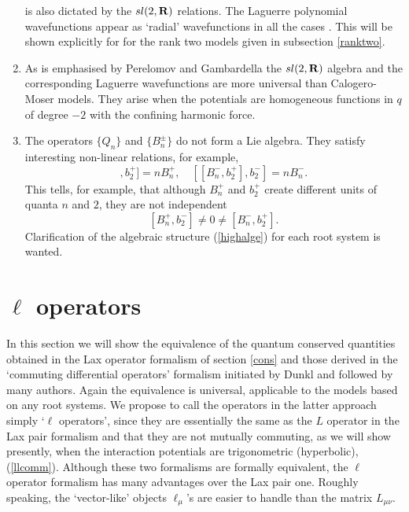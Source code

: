 \documentclass[a4paper,12pt]{article}
\begin{document}
\begin{enumerate}
is also dictated by the \(sl(2,{\bf R})\) relations.
The Laguerre polynomial wavefunctions appear as `radial' wavefunctions
in all the cases \cite{Cal1}.
This will be shown explicitly for
for the rank two models given in subsection \ref{ranktwo}.
\item
As is emphasised by Perelomov \cite{Pere1} and Gambardella \cite{Gamb}
the \(sl(2,{\bf R})\) algebra and the corresponding
Laguerre wavefunctions
are more universal than Calogero-Moser models.
They arise when the potentials are homogeneous functions
in \(q\) of degree
\(-2\) with the confining harmonic force.
\item
The operators \(\{Q_n\}\) and \(\{B_n^\pm\}\) do not form a Lie algebra.
They satisfy interesting non-linear relations, for example,
\begin{equation}
   [[B_n^+,b_2^-],b_2^+]=nB_n^+,\quad
   [[B_n^-,b_2^+],b_2^-]=nB_n^-.
   \label{highalge}
\end{equation}
This tells, for example, that although \(B_n^+\) and \(b_2^+\)
create different units of quanta \(n\) and \(2\), they are not independent
\[
   [B_n^+,b_2^-]\neq0\neq [B_n^-,b_2^+].
\]
Clarification of the algebraic structure (\ref{highalge}) for each root
system is wanted.
\end{enumerate}



\section{\(\ell\) operators}
\label{lops}
\setcounter{equation}{0}
In this section we will show the equivalence of the
quantum conserved quantities obtained in the Lax operator formalism
of section \ref{cons} and those derived in the `commuting differential
operators' formalism initiated by Dunkl \cite{Dunk} and followed by many
authors.
Again the equivalence is universal, applicable to the models based on
any root systems.
We propose to call the operators in the latter approach simply
`\(\ell\) operators', since they are essentially the same as the
\(L\) operator in the Lax pair formalism and that they are not mutually
commuting, as we will show presently, when the interaction potentials are
trigonometric (hyperbolic), (\ref{llcomm}).
Although these two formalisms are formally equivalent, the \(\ell\)
operator formalism has many advantages over the Lax pair
one. Roughly speaking, the `vector-like' objects \(\ell_\mu\)'s are easier
to handle than the matrix \(L_{\mu\nu}\).
\end{document}
